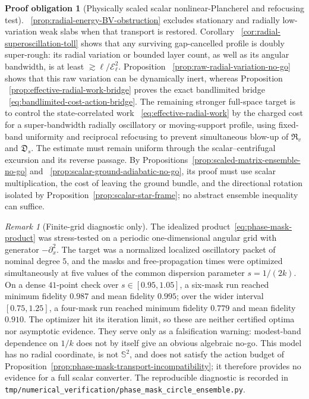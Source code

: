 \documentclass[11pt]{article}
\theoremstyle{definition}
\newtheorem{problem}[theorem]{Proof obligation}
\theoremstyle{remark}
\newtheorem{remark}[theorem]{Remark}
\begin{document}
\begin{problem}[Physically scaled scalar nonlinear-Plancherel and refocusing test]
 ~\ref{prop:radial-energy-BV-obstruction} excludes stationary and radially
 low-variation weak slabs when that transport is restored.  Corollary
 ~\ref{cor:radial-superoscillation-toll} shows that any surviving
 gap-cancelled profile is doubly super-rough: its radial variation or bounded
 layer count, as well as its angular bandwidth, is at least
 $\gtrsim\ell/\mathcal E_\ell^2$.  Proposition
 ~\ref{prop:raw-radial-variation-no-go} shows that this raw variation can be
 dynamically inert, whereas Proposition
 ~\ref{prop:effective-radial-work-bridge} proves the exact bandlimited bridge
 ~\eqref{eq:bandlimited-cost-action-bridge}.  The remaining stronger
 full-space target is to control the state-correlated work
 ~\eqref{eq:effective-radial-work} by the charged cost for a super-bandwidth
 radially oscillatory or moving-support profile, using fixed-band uniformity
 and reciprocal refocusing to prevent simultaneous blow-up of
 $\mathfrak R_v$ and $\mathfrak D_s$.  The estimate must remain uniform through
 the scalar--centrifugal excursion and its reverse passage.  By
 Propositions~\ref{prop:scaled-matrix-ensemble-no-go} and
 ~\ref{prop:scalar-ground-adiabatic-no-go}, its proof must use scalar
 multiplication, the cost of leaving the ground bundle, and the directional
 rotation isolated by Proposition~\ref{prop:scalar-star-frame}; no abstract
 ensemble inequality can suffice.
\end{problem}

\begin{remark}[Finite-grid diagnostic only]
The idealized product~\eqref{eq:phase-mask-product} was stress-tested on a
periodic one-dimensional angular grid with generator $-\partial_x^2$.  The
target was a normalized localized oscillatory packet of nominal degree $5$,
and the masks and free-propagation times were optimized simultaneously at five
 values of the common dispersion parameter $s=1/(2k)$.  On a dense $41$-point
 check over $s\in[0.95,1.05]$, a six-mask run reached minimum fidelity $0.987$
 and mean fidelity $0.995$; over the wider interval $[0.75,1.25]$, a four-mask
 run reached minimum fidelity $0.779$ and mean fidelity $0.910$.  The optimizer
 hit its iteration limit, so these are neither certified optima nor asymptotic
evidence.  They serve only as a falsification warning: modest-band dependence
on $1/k$ does not by itself give an obvious algebraic no-go.  This model has no
radial coordinate, is not $\mathbb S^2$, and does not satisfy the action budget
of Proposition~\ref{prop:phase-mask-transport-incompatibility}; it therefore
provides no evidence for a full scalar converter.  The reproducible diagnostic
is recorded in
\nolinkurl{tmp/numerical_verification/phase_mask_circle_ensemble.py}.
\end{remark}
\end{document}
